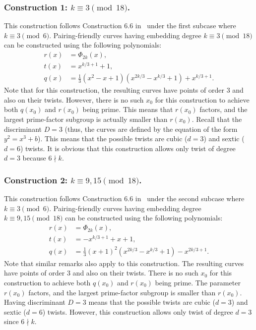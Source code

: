 \subsubsection{Construction 1: $k \equiv 3 \pmod{18}$.}
\label{con1}

This construction follows {Construction 6.6} in~\cite{2010/freeman}
under the first subcase where $k \equiv 3 \pmod{6}$.
Pairing-friendly curves having embedding degree $k \equiv 3 \pmod{18}$
can be constructed using the following polynomials:
\begin{align*}
r(x) &= \Phi_{2k}(x),	\\
t(x) &= x^{k/3+1} + 1,	\\
q(x) &= \frac{1}{3} (x^2 - x + 1) (x^{2k/3} - x^{k/3} + 1) + x^{k/3+1}.
\end{align*}
Note that for this construction,
the resulting curves have points of order 3 and also on their twists.
However, there is no such $x_0$ for this construction to achieve
both $q(x_0)$ and $r(x_0)$ being prime.
This means that $r(x_0)$ factors, and the largest prime-factor subgroup is actually smaller than $r(x_0)$.
Recall that the discriminant $D = 3$ (thus, the curves are defined by the equation of the form $y^2 = x^3 + b$).
This means that the possible twists are  cubic ($d=3$) and sextic ($d=6$) twists.
It is obvious that this construction allows only twist of degree $d = 3$ because $6 \nmid k$.


\subsubsection{Construction 2: $k \equiv 9,15 \pmod{18}$.}
\label{con2}

This construction follows {Construction 6.6} in~\cite{2010/freeman}
under the second subcase where $k \equiv 3 \pmod{6}$.
Pairing-friendly curves having embedding degree $k \equiv 9,15 \pmod{18}$
can be constructed using the following polynomials:
\begin{align*}
r(x) &= \Phi_{2k}(x),	\\
t(x) &= -x^{k/3+1} + x + 1,	\\
q(x) &= \frac{1}{3} (x+1)^2 (x^{2k/3} - x^{k/3} + 1) - x^{2k/3+1}.
\end{align*}
Note that similar remarks also apply to this construction.
The resulting curves have points of order 3 and also on their twists.
There is no such $x_0$ for this construction to achieve both $q(x_0)$ and $r(x_0)$ being prime.
The parameter  $r(x_0)$ factors, and the largest prime-factor subgroup is smaller than $r(x_0)$.
Having discriminant $D = 3$
means that the possible twists are  cubic ($d=3$) and sextic ($d=6$) twists.
However, this construction allows only twist of degree $d = 3$ since $6 \nmid k$.


